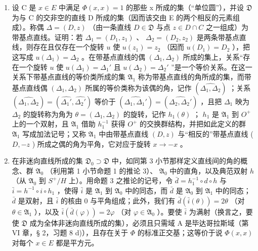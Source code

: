 \begin{enumerate}
\def\labelenumi{\alph{enumi})}
\item
  设 C 是 \(x \in E\) 中满足 \(\Phi(x, x) = 1\) 的那些 x 所成的集（“单位圆”），并设 \(\mathfrak{D}\) 为与 C 的交非空的直线 D 所成的集（因而该交由 E 的两个相反的元素组成）。称偶 \(\Delta = (D, z)\) （由一条直线 \(D \in \mathfrak{D}\) 与点 \(z \in D \cap C\) 之一组成）为带基点直线。证明：若 \(\Delta_1 = (D_1, z_1)\) 、 \(\Delta_2 = (D_2, z_2)\) 是两条带基点直线，则存在且仅存在一个旋转 \(u\) 使 \(u(z_1) = z_2\) （因而 \(u(D_1) = D_2\) ），把这写成 \(u(\Delta_1) = \Delta_2\) 。在带基点直线的偶 \((\Delta_1, \Delta_2)\) 所成的集上，关系“存在一个旋转 \(u\) 使 \(u(\Delta_1) = \Delta_1'\) 且 \(u(\Delta_2) = \Delta_2'\) ”是一个等价关系。在这一关系下带基点直线的等价类所成的集 \(\mathfrak{A}_1\) 称为带基点直线的角所成的集，而带基点直线偶 \((\Delta_1, \Delta_2)\) 所属的等价类称为该偶的角，记作 \((\widehat{\Delta_1, \Delta_2})\) ；关系 \((\widehat{\Delta_1, \Delta_2}) = (\widehat{\Delta_1'}, \widehat{\Delta_2'})\) 等价于 \((\widehat{\Delta_1, \Delta_1'}) = (\widehat{\Delta_2, \Delta_2'})\) ，且把 \(\Delta_1\) 映为 \(\Delta_2\) 的旋转称为角为 \(\theta = (\Delta_1, \Delta_2)\) 的旋转，记作 \(h_1(\theta)\) ； \(h_1\) 是 \(\mathfrak{A}_1\) 到 \(O^+\) 上的一个双射，且 \(\mathfrak{A}_1\) 借助 \(h_1^{-1}\) 获得 \(O^+\) 的交换群结构，并把如此定义的群 \(\mathfrak{A}_1\) 写成加法记号；又称 \(\mathfrak{A}_1\) 中由带基点直线 \((D, z)\) 与“相反的”带基点直线 ( \(D, -z\) ) 所成之偶的角为平角，它对应于旋转 \(x \to -x\) 。
\item
  在非迷向直线所成的集 \(\mathfrak{D}_{0} \supset \mathfrak{D}\) 中，如同第 3 小节那样定义直线间的角的概念、群 \(\mathfrak{A}_{0}\) （利用第 1 小节命题 1 的推论 3）、 \(\mathfrak{A}_{0}\) 中的直角，以及典范双射 \(h\) （从 \(\mathfrak{A}_{0}\) 到 \(S^{+}/H\) 上）。用命题 3 之推论的记号，令 \(\bar{d} = h_{1}^{-1} \circ d \circ h\) 与 \(\bar{i} = h^{-1} \circ i \circ h_{1}\) ，使得 \(\bar{i}\) 是 \(\mathfrak{A}_{1}\) 到 \(\mathfrak{A}_{0}\) 中的同态，而 \(\bar{d}\) 是 \(\mathfrak{A}_{0}\) 到 \(\mathfrak{A}_{1}\) 中的同态； \(\bar{d}\) 是双射，且 \(\bar{i}\) 的核由 0 与平角组成；此外，我们有 \(\bar{d}(\bar{i}(\theta)) = 2\theta\) （对 \(\theta \in \mathfrak{A}_{1}\) ），以及 \(\bar{i}(\bar{d}(\varphi)) = 2\varphi\) （对 \(\varphi \in \mathfrak{A}_{0}\) ）。要使 \(\bar{i}\) 为满射（换言之，要使 \(\mathfrak{D}\) 成为全体非迷向直线所成的集），必须且只需域 A 是毕达哥拉斯域（第 VI 章，§ 2，习题 8 d)），且存在关于 \(\Phi\) 的标准正交基；这等价于说 \(\Phi(x, x)\) 对每个 \(x \in E\) 都是平方元。
\end{enumerate}

